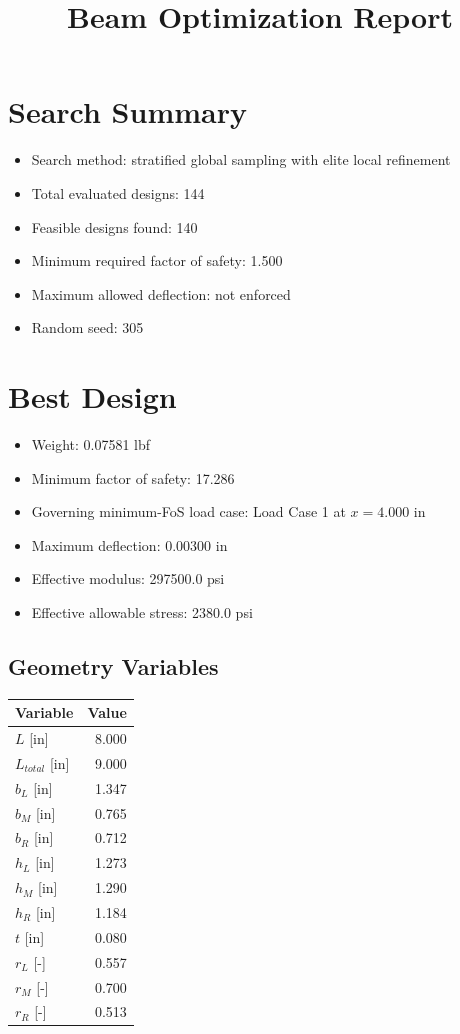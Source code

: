 \documentclass[11pt]{article}
\title{Beam Optimization Report}
\date{}
\begin{document}
\maketitle

\section*{Search Summary}
\begin{itemize}
\item Search method: stratified global sampling with elite local refinement
\item Total evaluated designs: 144
\item Feasible designs found: 140
\item Minimum required factor of safety: 1.500
\item Maximum allowed deflection: not enforced
\item Random seed: 305
\end{itemize}

\section*{Best Design}
\begin{itemize}
\item Weight: 0.07581 lbf
\item Minimum factor of safety: 17.286
\item Governing minimum-FoS load case: Load Case 1 at $x=4.000$ in
\item Maximum deflection: 0.00300 in
\item Effective modulus: 297500.0 psi
\item Effective allowable stress: 2380.0 psi
\end{itemize}

\subsection*{Geometry Variables}
\begin{center}
\begin{tabular}{lr}
\toprule
Variable & Value \\
\midrule
$L$ [in] & 8.000 \\
$L_{total}$ [in] & 9.000 \\
$b_L$ [in] & 1.347 \\
$b_M$ [in] & 0.765 \\
$b_R$ [in] & 0.712 \\
$h_L$ [in] & 1.273 \\
$h_M$ [in] & 1.290 \\
$h_R$ [in] & 1.184 \\
$t$ [in] & 0.080 \\
$r_L$ [-] & 0.557 \\
$r_M$ [-] & 0.700 \\
$r_R$ [-] & 0.513 \\
\bottomrule
\end{tabular}
\end{center}
\end{document}
